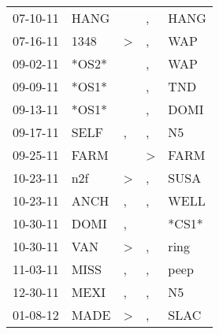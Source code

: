 \begin{supertabular}{p{0.07\textwidth}p{0.06\textwidth}p{0.02\textwidth}p{0.02\textwidth}p{0.06\textwidth}}
          07-10-11\textsuperscript{} &           HANG\textsuperscript{} &                  &                , &           HANG\textsuperscript{} \\
          07-16-11\textsuperscript{} &           1348\textsuperscript{} &     \textgreater &                , &            WAP\textsuperscript{} \\
          09-02-11\textsuperscript{} &                            *OS2* &                  &                , &            WAP\textsuperscript{} \\
          09-09-11\textsuperscript{} &                            *OS1* &                  &                , &            TND\textsuperscript{} \\
          09-13-11\textsuperscript{} &                            *OS1* &                  &                , &           DOMI\textsuperscript{} \\
          09-17-11\textsuperscript{} &           SELF\textsuperscript{} &                , &                , &             N5\textsuperscript{} \\
          09-25-11\textsuperscript{} &           FARM\textsuperscript{} &                  &     \textgreater &           FARM\textsuperscript{} \\
          10-23-11\textsuperscript{} &            n2f\textsuperscript{} &     \textgreater &                , &           SUSA\textsuperscript{} \\
          10-23-11\textsuperscript{} &           ANCH\textsuperscript{} &                , &                , &           WELL\textsuperscript{} \\
          10-30-11\textsuperscript{} &           DOMI\textsuperscript{} &                , &                  &                            *CS1* \\
          10-30-11\textsuperscript{} &            VAN\textsuperscript{} &     \textgreater &                , &           ring\textsuperscript{} \\
          11-03-11\textsuperscript{} &           MISS\textsuperscript{} &                , &                , &           peep\textsuperscript{} \\
          12-30-11\textsuperscript{} &           MEXI\textsuperscript{} &                , &                , &             N5\textsuperscript{} \\
          01-08-12\textsuperscript{} &           MADE\textsuperscript{} &     \textgreater &                , &           SLAC\textsuperscript{} \\

\end{supertabular}
